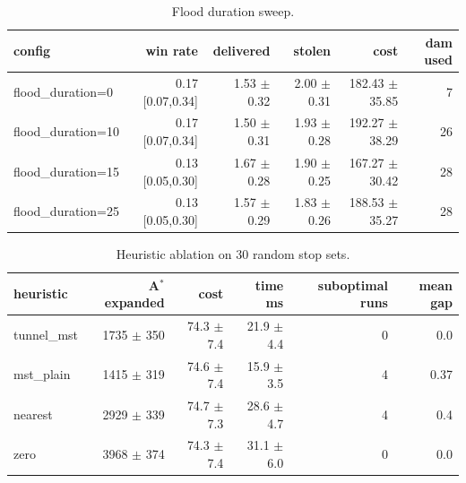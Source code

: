\begin{table}[t]
\centering
\footnotesize
\caption{Flood duration sweep.}
\label{tab:flood}
\setlength{\tabcolsep}{3pt}
\begin{tabular}{lrrrrr}
\toprule
config & win rate & delivered & stolen & cost & dam used \\
\midrule
flood\_duration=0 & 0.17 [0.07,0.34] & 1.53 $\pm$ 0.32 & 2.00 $\pm$ 0.31 & 182.43 $\pm$ 35.85 & 7 \\
flood\_duration=10 & 0.17 [0.07,0.34] & 1.50 $\pm$ 0.31 & 1.93 $\pm$ 0.28 & 192.27 $\pm$ 38.29 & 26 \\
flood\_duration=15 & 0.13 [0.05,0.30] & 1.67 $\pm$ 0.28 & 1.90 $\pm$ 0.25 & 167.27 $\pm$ 30.42 & 28 \\
flood\_duration=25 & 0.13 [0.05,0.30] & 1.57 $\pm$ 0.29 & 1.83 $\pm$ 0.26 & 188.53 $\pm$ 35.27 & 28 \\
\bottomrule
\end{tabular}
\end{table}

\begin{table}[t]
\centering
\footnotesize
\caption{Heuristic ablation on 30 random stop sets.}
\label{tab:abl}
\setlength{\tabcolsep}{3pt}
\begin{tabular}{lrrrrr}
\toprule
heuristic & A$^*$ expanded & cost & time ms & suboptimal runs & mean gap \\
\midrule
tunnel\_mst & 1735 $\pm$ 350 & 74.3 $\pm$ 7.4 & 21.9 $\pm$ 4.4 & 0 & 0.0 \\
mst\_plain & 1415 $\pm$ 319 & 74.6 $\pm$ 7.4 & 15.9 $\pm$ 3.5 & 4 & 0.37 \\
nearest & 2929 $\pm$ 339 & 74.7 $\pm$ 7.3 & 28.6 $\pm$ 4.7 & 4 & 0.4 \\
zero & 3968 $\pm$ 374 & 74.3 $\pm$ 7.4 & 31.1 $\pm$ 6.0 & 0 & 0.0 \\
\bottomrule
\end{tabular}
\end{table}
